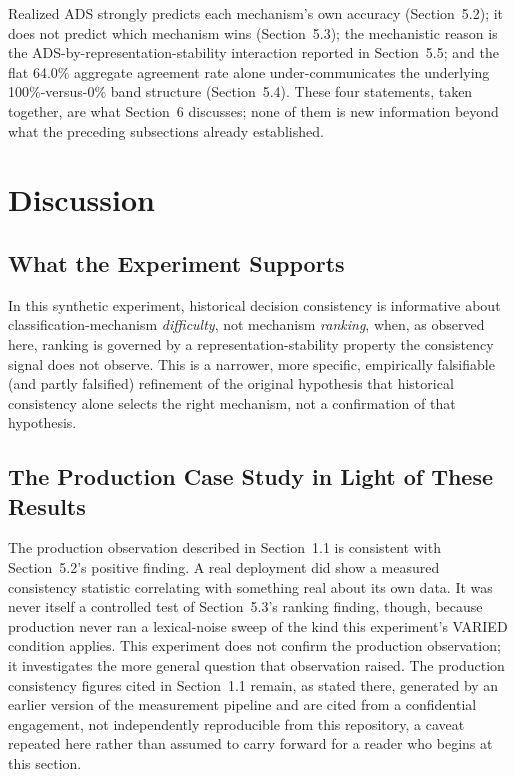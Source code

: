\documentclass[11pt]{article}
\begin{document}
Realized ADS strongly predicts each mechanism's own accuracy (Section~5.2);
it does not predict which mechanism wins (Section~5.3); the mechanistic
reason is the ADS-by-representation-stability interaction reported in
Section~5.5; and the flat 64.0\% aggregate agreement rate alone
under-communicates the underlying 100\%-versus-0\% band structure
(Section~5.4). These four statements, taken together, are what Section~6
discusses; none of them is new information beyond what the preceding
subsections already established.

\section{Discussion}
\label{sec:discussion}

\subsection{What the Experiment Supports}
\label{sec:what-is-supported}

In this synthetic experiment, historical decision consistency is informative
about classification-mechanism \emph{difficulty}, not mechanism
\emph{ranking}, when, as observed here, ranking is governed by a
representation-stability property the consistency signal does not observe.
This is a narrower, more specific, empirically falsifiable (and partly
falsified) refinement of the original hypothesis that historical
consistency alone selects the right mechanism, not a confirmation of that
hypothesis.

\subsection{The Production Case Study in Light of These Results}
\label{sec:production-case-study}

The production observation described in Section~1.1 is consistent with
Section~5.2's positive finding. A real deployment did show a measured
consistency statistic correlating with something real about its own data. It
was never itself a controlled test of Section~5.3's ranking finding, though,
because production never ran a lexical-noise sweep of the kind this
experiment's VARIED condition applies. This experiment does not confirm the
production observation; it investigates the more general question that
observation raised. The production consistency figures cited in Section~1.1
remain, as stated there, generated by an earlier version of the measurement
pipeline and are cited from a confidential engagement, not independently
reproducible from this repository, a caveat repeated here rather than
assumed to carry forward for a reader who begins at this section.
\end{document}
